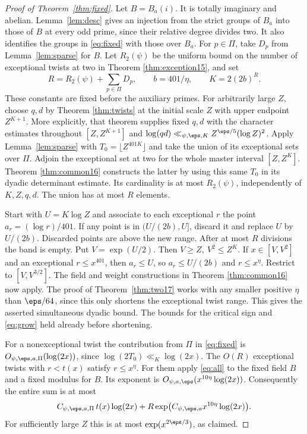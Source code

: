 \documentclass[a4paper,11pt]{article}
\theoremstyle{definition}
\theoremstyle{remark}
\numberwithin{equation}{section}
\begin{document}
\begin{proof}[Proof of Theorem~\ref{thm:fixed}]
Let \(B=B_a(i)\). It is totally imaginary and abelian. Lemma~\ref{lem:desc} gives an injection from the strict groups of \(B_a\) into those of \(B\) at every odd prime, since their relative degree divides two. It also identifies the groups in \eqref{eq:fixed} with those over \(B_a\). For \(p\in\Pi\), take \(D_p\) from Lemma~\ref{lem:sparse} for \(B\). Let \(R_2(\psi)\) be the uniform bound on the number of exceptional twists at two in Theorem \ref{thm:exception15}, and set
\[
 R=R_2(\psi)+\sum_{p\in\Pi}D_p,\qquad b=401/\eta,\qquad K=2(2b)^R .
\]
These constants are fixed before the auxiliary primes. For arbitrarily large \(Z\), choose \(q,d\) by Theorem \ref{thm:twists} at the initial scale \(Z\) with upper endpoint \(Z^{K+1}\). More explicitly, that theorem supplies fixed \(q,d\) with the character estimates throughout \([Z,Z^{K+1}]\) and \(\log(qd)\ll_{\psi,\eps,K}Z^{\eps/5}(\log Z)^2\). Apply Lemma~\ref{lem:sparse} with \(T_0=\lfloor Z^{401K}\rfloor\) and take the union of its exceptional sets over \(\Pi\). Adjoin the exceptional set at two for the whole master interval \([Z,Z^K]\). Theorem \ref{thm:common16} constructs the latter by using this same \(T_0\) in its dyadic determinant estimate. Its cardinality is at most \(R_2(\psi)\), independently of \(K,Z,q,d\). The union has at most \(R\) elements.

Start with \(U=K\log Z\) and associate to each exceptional \(r\) the point \(a_r=(\log r)/401\). If any point is in \((U/(2b),U]\), discard it and replace \(U\) by \(U/(2b)\). Discarded points are above the new range. After at most \(R\) divisions the band is empty. Put \(V=\exp(U/2)\). Then \(V\ge Z,\ V^2\le Z^K\). If \(x\in[V,V^2]\) and an exceptional \(r\le x^{401}\), then \(a_r\le U\), so \(a_r\le U/(2b)\) and \(r\le x^\eta\). Restrict to \([V,V^{3/2}]\). The field and weight constructions in Theorem \ref{thm:common16} now apply. The proof of Theorem~\ref{thm:two17} works with any smaller positive \(\eta\) than \(\eps/64\), since this only shortens the exceptional twist range. This gives the asserted simultaneous dyadic bound. The bounds for the critical sign and \eqref{eq:grow} held already before shortening.

For a nonexceptional twist the contribution from \(\Pi\) in \eqref{eq:fixed} is \(O_{\psi,\eps,a,\Pi}(\log(2x))\), since \(\log(2T_0)\ll_K\log(2x)\). The \(O(R)\) exceptional twists with \(r<t(x)\) satisfy \(r\le x^\eta\). For them apply \eqref{eq:all} to the fixed field \(B\) and a fixed modulus for \(B\). Its exponent is \(O_{\psi,a,\eps}(x^{10\eta}\log(2x))\). Consequently the entire sum is at most
\[
 C_{\psi,\eps,a,\Pi}\,t(x)\log(2x)
       +R\exp\!\big(C_{\psi,\eps,a} x^{10\eta}\log(2x)\big).
\]
For sufficiently large \(Z\) this is at most \(\exp(x^{2\eps/3})\), as claimed.
\end{proof}
\end{document}
